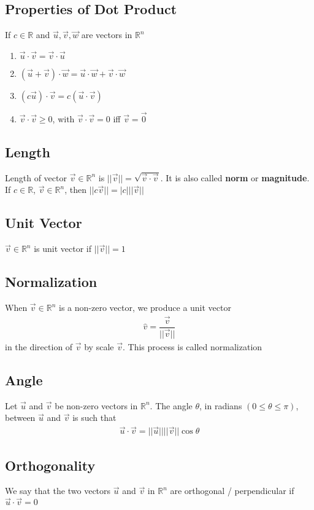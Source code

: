 \documentclass[12pt, letterpaper]{article}
\begin{document}
\subsection{Properties of Dot Product}
If $c\in\mathbb{R}$ and $\vec{u}, \vec{v}, \vec{w}$ are vectors in $\mathbb{R}^n$
\begin{enumerate}
    \item $\vec{u} \cdot \vec{v} = \vec{v} \cdot \vec{u}$
    \item $(\vec{u}+\vec{v})\cdot\vec{w} = \vec{u}\cdot\vec{w} + \vec{v}\cdot\vec{w}$
    \item $(c\vec{u})\cdot\vec{v} = c(\vec{u}\cdot\vec{v})$
    \item $\vec{v}\cdot\vec{v} \geq 0$, with $\vec{v}\cdot\vec{v} = 0$ iff $\vec{v} = \vec{0}$
\end{enumerate}
\subsection{Length}
Length of vector $\vec{v}\in\mathbb{R}^n$ is $||\vec{v}|| = \sqrt{\vec{v}\cdot\vec{v}}$. It is also called \textbf{norm} or \textbf{magnitude}.
If $c\in\mathbb{R}$, $\vec{v}\in\mathbb{R}^n$, then $||c\vec{v}|| = |c|||\vec{v}||$
\subsection{Unit Vector}
$\vec{v}\in\mathbb{R}^n$ is unit vector if $||\vec{v}|| = 1$
\subsection{Normalization}
When $\vec{v}\in\mathbb{R}^n$ is a non-zero vector, we produce a unit vector 
\begin{align*}
    \hat{v} = \dfrac{\vec{v}}{||\vec{v}||}
\end{align*}
in the direction of $\vec{v}$ by scale $\vec{v}$. This process is called normalization
\subsection{Angle}
Let $\vec{u}$ and $\vec{v}$ be non-zero vectors in $\mathbb{R}^n$. The angle $\theta$, in radians $(0\leq\theta\leq\pi)$, 
between $\vec{u}$ and $\vec{v}$ is such that 
\begin{align*}
    \vec{u}\cdot\vec{v} = ||\vec{u}||||\vec{v}||\cos\theta 
\end{align*}
\subsection{Orthogonality}
We say that the two vectors $\vec{u}$ and $\vec{v}$ in $\mathbb{R}^n$ are orthogonal / perpendicular if $\vec{u}\cdot\vec{v} = 0$
\end{document}
